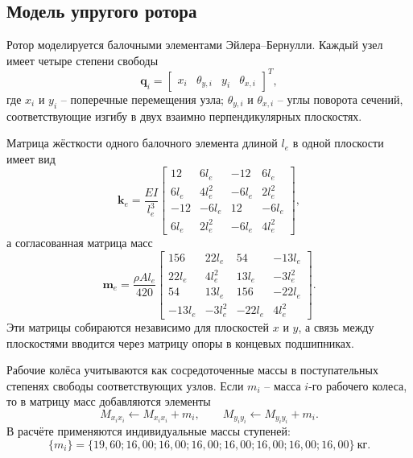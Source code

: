 \documentclass[14pt,a4paper]{extarticle}
\numberwithin{equation}{section}
\numberwithin{figure}{section}
\numberwithin{table}{section}
\begin{document}
\subsection{Модель упругого ротора}

Ротор моделируется балочными элементами Эйлера--Бернулли. Каждый узел имеет четыре степени свободы
\begin{equation}
    \mathbf{q}_i=\begin{bmatrix}x_i&\theta_{y,i}&y_i&\theta_{x,i}\end{bmatrix}^T,
    \label{eq:node_dofs}
\end{equation}
где $x_i$ и $y_i$ -- поперечные перемещения узла; $\theta_{y,i}$ и $\theta_{x,i}$ -- углы поворота сечений, соответствующие изгибу в двух взаимно перпендикулярных плоскостях.

Матрица жёсткости одного балочного элемента длиной $l_e$ в одной плоскости имеет вид
\begin{equation}
    \mathbf{k}_e=\frac{EI}{l_e^3}
    \begin{bmatrix}
    12&6l_e&-12&6l_e\\
    6l_e&4l_e^2&-6l_e&2l_e^2\\
    -12&-6l_e&12&-6l_e\\
    6l_e&2l_e^2&-6l_e&4l_e^2
    \end{bmatrix},
    \label{eq:beam_stiffness}
\end{equation}
а согласованная матрица масс
\begin{equation}
    \mathbf{m}_e=\frac{\rho A l_e}{420}
    \begin{bmatrix}
    156&22l_e&54&-13l_e\\
    22l_e&4l_e^2&13l_e&-3l_e^2\\
    54&13l_e&156&-22l_e\\
    -13l_e&-3l_e^2&-22l_e&4l_e^2
    \end{bmatrix}.
    \label{eq:beam_mass}
\end{equation}
Эти матрицы собираются независимо для плоскостей $x$ и $y$, а связь между плоскостями вводится через матрицу опоры в концевых подшипниках.

Рабочие колёса учитываются как сосредоточенные массы в поступательных степенях свободы соответствующих узлов. Если $m_i$ -- масса $i$-го рабочего колеса, то в матрицу масс добавляются элементы
\begin{equation}
    M_{x_i x_i}\leftarrow M_{x_i x_i}+m_i,
    \qquad
    M_{y_i y_i}\leftarrow M_{y_i y_i}+m_i.
\end{equation}
В расчёте применяются индивидуальные массы ступеней:
\begin{equation}
    \{m_i\}=\{19{,}60; 16{,}00; 16{,}00; 16{,}00; 16{,}00; 16{,}00; 16{,}00; 16{,}00\}\ \text{кг}.
    \label{eq:stage_masses}
\end{equation}
\end{document}

